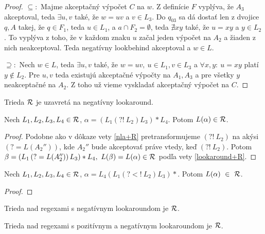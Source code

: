 \begin{proof}
$\subseteq:$
Majme akceptačný výpočet $C$ na $w$. Z definície $F$ vyplýva, že $A_3$ akceptoval, teda $\exists u,v$ také, že $w=uv$ a $v \in L_3$. Do $q_{03}$ sa dá dostať len z dvojice $q,A$ takej, že $q\in F_1$, teda $u\in L_1$, a $a \cap F_2 = \emptyset$, teda $\nexists xy$ také, že $u=xy$ a $y \in L_2$. To vyplýva z toho, že v každom znaku $u$ začal jeden výpočet na $A_2$ a žiaden z nich neakceptoval. Teda negatívny lookbehind akceptoval a $w\in L$.

$\supseteq:$
Nech $w\in L$, teda $\exists u,v$ také, že $w=uv,~ u \in L_1, v\in L_3$ a $\forall x,y:~u=xy$ platí $y \notin L_2$. Pre $u,v$ teda existujú akceptačné výpočty na $A_1,A_3$ a pre všetky $y$ neakceptačné na $A_2$. Z toho už vieme vyskladať akceptačný výpočet na $C$.
\end{proof}

\begin{veta}
Trieda ${\cal R}$ je uzavretá na negatívny lookaround.
\end{veta}

\begin{lema}
Nech $L_1,L_2,L_3,L_4 \in {\cal R}$, $\alpha = \left( L_1 \left( ?!~L_2\right) L_3 \right) * L_4$. Potom $L(\alpha) \in {\cal R}$.
\end{lema} 
\begin{proof}
Podobne ako v dôkaze vety \ref{nla+R} pretransformujeme $( ?!~L_2)$ na akýsi $( ?=L(A_2''))$, kde $A_2''$ bude akceptovať práve vtedy, keď $( ?!~L_2)$. Potom $\beta = \left( L_1 \left( ?=L(A_2'')\right) L_3 \right) * L_4, ~ L(\beta) = L(\alpha) \in {\cal R}$ podľa vety \ref{lookaround+R}.
\end{proof}

\begin{lema}
Nech $L_1,L_2,L_3,L_4 \in {\cal R}$, $\alpha = L_4 \left( L_1 \left( ?<!~L_2\right) L_3 \right) *$. Potom $L(\alpha)~\in~{\cal R}$.
\end{lema} 
\begin{proof}
\todo
\end{proof}

\begin{veta}\label{nlookaround+R}
Trieda nad regexami s negatívnym lookaroundom je ${\cal R}$.
\end{veta}

\begin{dosledok}
Trieda nad regexami s pozitívnym a negatívnym lookaroundom je ${\cal R}$.
\end{dosledok}

